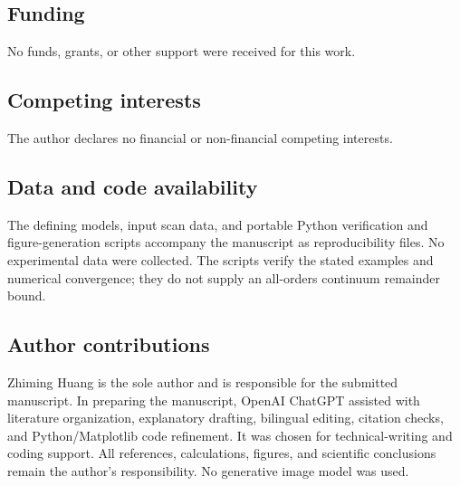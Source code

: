 \documentclass[pdflatex,sn-mathphys-num]{sn-jnl}
\begin{document}
\subsection*{Funding}
No funds, grants, or other support were received for this work.
\subsection*{Competing interests}
The author declares no financial or non-financial competing interests.
\subsection*{Data and code availability}
The defining models, input scan data, and portable Python verification and figure-generation scripts accompany the manuscript as reproducibility files. No experimental data were collected. The scripts verify the stated examples and numerical convergence; they do not supply an all-orders continuum remainder bound.
\subsection*{Author contributions}
Zhiming Huang is the sole author and is responsible for the submitted manuscript.
In preparing the manuscript, OpenAI ChatGPT assisted with literature organization, explanatory drafting, bilingual editing, citation checks, and Python/Matplotlib code refinement. It was chosen for technical-writing and coding support. All references, calculations, figures, and scientific conclusions remain the author's responsibility. No generative image model was used.

\end{document}
